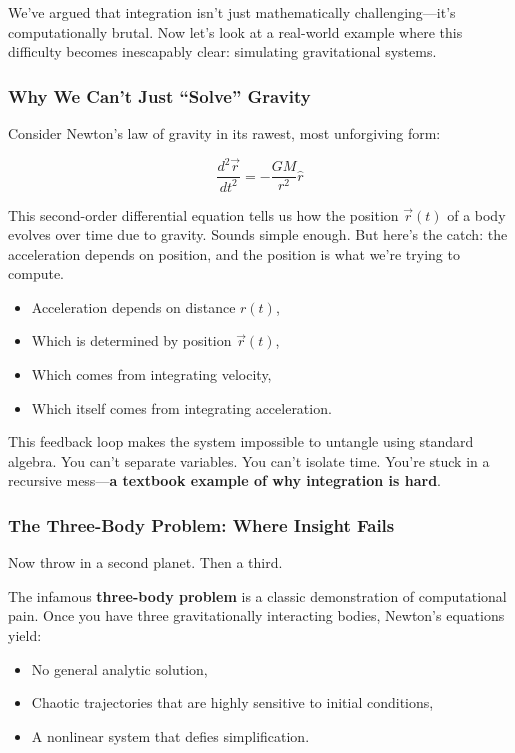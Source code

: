 We’ve argued that integration isn’t just mathematically challenging—it’s computationally brutal. Now let’s look at a real-world example where this difficulty becomes inescapably clear: simulating gravitational systems.

\subsubsection{Why We Can’t Just “Solve” Gravity}

Consider Newton’s law of gravity in its rawest, most unforgiving form:

\[
\frac{d^2\vec{r}}{dt^2} = -\frac{GM}{r^2} \hat{r}
\]

This second-order differential equation tells us how the position \( \vec{r}(t) \) of a body evolves over time due to gravity. Sounds simple enough. But here’s the catch: the acceleration depends on position, and the position is what we’re trying to compute.

\begin{itemize}
  \item Acceleration depends on distance \( r(t) \),
  \item Which is determined by position \( \vec{r}(t) \),
  \item Which comes from integrating velocity,
  \item Which itself comes from integrating acceleration.
\end{itemize}

This feedback loop makes the system impossible to untangle using standard algebra. You can’t separate variables. You can’t isolate time. You’re stuck in a recursive mess—\textbf{a textbook example of why integration is hard}.

\subsubsection{The Three-Body Problem: Where Insight Fails}

Now throw in a second planet. Then a third.

The infamous \textbf{three-body problem} is a classic demonstration of computational pain. Once you have three gravitationally interacting bodies, Newton’s equations yield:

\begin{itemize}
  \item No general analytic solution,
  \item Chaotic trajectories that are highly sensitive to initial conditions,
  \item A nonlinear system that defies simplification.
\end{itemize}

